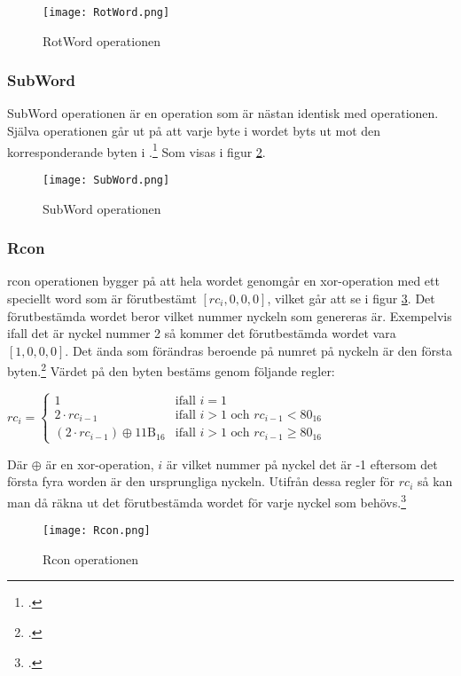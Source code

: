 \begin{figure}[H]
    \centering
    \texttt{[image: RotWord.png]}
    \caption{RotWord operationen}
    \label{fig:aes-rotword-pic}
\end{figure}

\subsubsection{SubWord}
\label{sec:aes-subword}

SubWord operationen är en operation som är nästan identisk med  operationen. Själva operationen går ut på att varje \gls{byte} i wordet byts ut mot den korresponderande \gls{byte}n i .\footcite{daemen1999aes}
Som visas i figur \ref{fig:aes-subword-pic}.

\begin{figure}[H]
    \centering
    \texttt{[image: SubWord.png]}
    \caption{SubWord operationen}
    \label{fig:aes-subword-pic}
\end{figure}

\subsubsection{Rcon}
\label{sec:aes-rcon}

\acrshort{rcon} operationen bygger på att hela wordet genomgår en \gls{xor}-operation med ett speciellt word som är förutbestämt $[rc_i, 0, 0, 0]$, vilket går att se i figur \ref{fig:aes-rcon-pic}.
Det förutbestämda wordet beror vilket nummer nyckeln som genereras är.
Exempelvis ifall det är nyckel nummer 2 så kommer det förutbestämda wordet vara $[1, 0, 0, 0]$. Det ända som förändras beroende på numret på nyckeln är den första \gls{byte}n.\footcite{daemen1999aes}
Värdet på den \gls{byte}n bestäms genom följande regler:

\begin{center}
    \begin{math}
        rc_i =
        \begin{cases}
            1 & \text{ifall } i = 1 \\
            2 \cdot rc_{i-1} & \text{ifall } i > 1 \text{ och } rc_{i-1} < 80_{16} \\
            (2 \cdot rc_{i-1}) \oplus \text {11B}_{16} & \text{ifall } i > 1 \text{ och } rc_{i-1} \ge 80_{16}
        \end{cases}
    \end{math}
\end{center}

Där $\oplus$ är en \gls{xor}-operation, $i$ är vilket nummer på nyckel det är -1 eftersom det första fyra worden är den ursprungliga nyckeln.
Utifrån dessa regler för $rc_i$ så kan man då räkna ut det förutbestämda wordet för varje nyckel som behövs.\footcite{daemen1999aes}

\begin{figure}[H]
    \centering
    \texttt{[image: Rcon.png]}
    \caption{Rcon operationen}
    \label{fig:aes-rcon-pic}
\end{figure}
